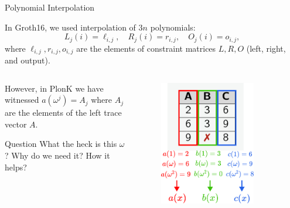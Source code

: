 \documentclass{zkdl-presentation-template}
\begin{document}
    \begin{frame}{Polynomial Interpolation}
        \begin{example}
            In Groth16, we used interpolation of $3n$ polynomials:
            \begin{equation*}
                L_j(i) = \ell_{i,j}, \quad R_j(i) = r_{i,j}, \quad O_j(i) = o_{i,j},
            \end{equation*}
            where $\ell_{i,j}, r_{i,j}, o_{i,j}$ are the elements of constraint
            matrices $L, R, O$ (left, right, and output).
        \end{example}

        \begin{columns}
            \begin{column}{0.65\textwidth}
                However, in PlonK we have witnessed $a(\omega^j) = A_j$ where
                $A_j$ are the elements of the left trace vector $A$.

                \begin{alertblock}{Question}
                    What the heck is this $\omega$? Why do we 
                    need it? How it helps?
                \end{alertblock}
            \end{column}
            \begin{column}{0.35\textwidth}
                \begin{figure}
                    \centering
                    \includegraphics[width=0.8\textwidth]{images/lecture_13/plonk_table.pdf}
                \end{figure}
            \end{column}
        \end{columns}
    \end{frame}
\end{document}
